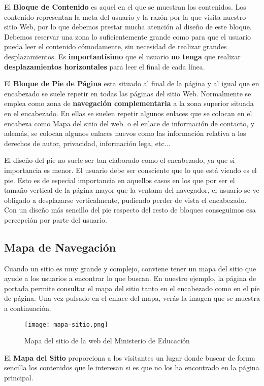 El \textbf{Bloque de Contenido} es aquel en el que se muestran los contenidos. Los contenido representan la meta del usuario y la razón por la que visita nuestro sitio Web, por lo que debemos prestar mucha atención al diseño de este bloque. Debemos reservar una zona lo suficientemente grande como para que el usuario pueda leer el contenido cómodamente, sin necesidad de realizar grandes desplazamientos. Es \textbf{importantísimo} que el usuario \textbf{no tenga} que realizar \textbf{desplazamientos horizontales} para leer el final de cada línea.

El \textbf{Bloque de Pie de Página} esta situado al final de la página y al igual que en encabezado se suele repetir en todas las páginas del sitio Web. Normalmente se emplea como zona de \textbf{navegación complementaria} a la zona superior situada en el encabezado. En ellas se suelen repetir algunos enlaces que se colocan en el encabeza como Mapa del sitio del web. o el enlace de información de contacto, y además, se colocan algunos enlaces nuevos como las información relativa a los derechos de autor, privacidad, información lega, etc...

El diseño del pie no suele ser tan elaborado como el encabezado, ya que si importancia es menor. El usuario debe ser consciente que lo que está viendo es el pie. Esto es de especial importancia en aquellos casos en los que por ser el tamaño vertical de la página mayor que la ventana del navegador, el usuario se ve obligado a desplazarse verticalmente, pudiendo perder de vista el encabezado. Con un diseño más sencillo del pie respecto del resto de bloques conseguimos esa percepción por parte del usuario.

\subsection{Mapa de Navegación}
Cuando un sitio es muy grande y complejo, conviene tener un mapa del sitio que ayude a los usuarios a encontrar lo que buscan. En nuestro ejemplo, la página de portada permite consultar el mapa del sitio tanto en el encabezado como en el píe de página. Una vez pulsado en el enlace del mapa, verás la imagen que se muestra a continuación.

\begin{figure}[H]
    \centering
    \texttt{[image: mapa-sitio.png]}
    \caption{Mapa del sitio de la web del Ministerio de Educación}
\end{figure}

El \textbf{Mapa del Sitio} proporciona a los visitantes un lugar donde buscar de forma sencilla los contenidos que le interesan si es que no los ha encontrado en la página principal.

